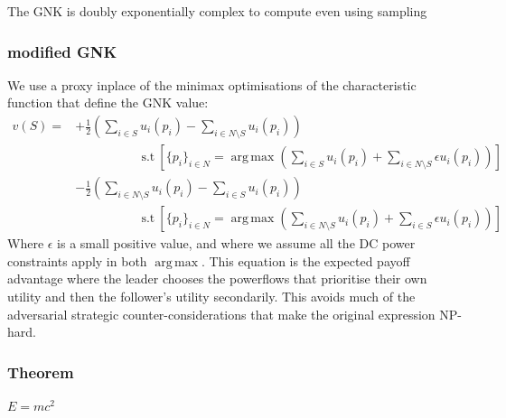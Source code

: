 \documentclass{beamer}
\DeclareMathOperator*{\argmax}{arg\,max}
\begin{document}
\begin{frame}

\end{frame}

\begin{frame}

The GNK is doubly exponentially complex to compute even using sampling
\end{frame}


\begin{frame}
\frametitle{modified GNK}
We use a proxy inplace of the minimax optimisations of the characteristic function that define the GNK value:
\begin{align}
\label{knvalue22}
v(S) = &+ \frac{1}{2}\left(\sum_{i\in S} u_i(p_i) - \sum_{i\in N\setminus S}u_i(p_i)\right)\nonumber\\
&\quad\quad\quad\quad\quad~\text{s.t}~ \left[\{p_i\}_{i\in N}=\argmax \left(\sum_{i\in S} u_i(p_i) + \sum_{i\in N\setminus S}\epsilon u_i(p_i)\right)\right]\nonumber\\
&- \frac{1}{2}\left(\sum_{i\in N\setminus S}u_i(p_i) - \sum_{i\in S} u_i(p_i)\right)\nonumber\\
&\quad\quad\quad\quad\quad~\text{s.t}~ \left[\{p_i\}_{i\in N}=\argmax \left(\sum_{i\in N\setminus S}u_i(p_i) + \sum_{i\in S} \epsilon u_i(p_i) \right)\right]
\end{align}
Where $\epsilon$ is a small positive value, and where we assume all the DC power constraints apply in both $\argmax$.
This equation is the expected payoff advantage where the leader chooses the powerflows that prioritise their own utility and then the follower's utility secondarily.
This avoids much of the adversarial strategic counter-considerations that make the original expression NP-hard.
\end{frame}
\begin{frame}

\end{frame}
\begin{frame}

\end{frame}



\begin{frame}
\frametitle{Theorem}
\begin{theorem}
$E = mc^2$
\end{theorem}
\end{frame}
\end{document}
